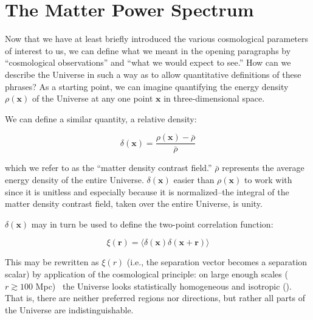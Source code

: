 \section{The Matter Power Spectrum}
\label{sec: Pk_intro}

Now that we have at least briefly introduced the various cosmological
parameters of interest to us, we can define what we meant in the opening
paragraphs by ``cosmological observations'' and ``what we would expect to
see.'' How can we describe the Universe in such a way as to allow quantitative 
definitions of these phrases? As a starting point, we can imagine quantifying 
the energy density $\rho(\bm{x})$ of the Universe at any one point $\bm{x}$ in 
three-dimensional space.


We can define a similar quantity, a relative density:

\begin{equation}
\delta(\bm{x}) = \frac{\rho(\bm{x}) - \bar{\rho}}{\bar{\rho}}
\end{equation}

which we refer to as the ``matter density contrast field.'' $\bar{\rho}$
represents the average energy density of the entire Universe. 
$\delta(\bm{x})$ easier than $\rho(\bm{x})$ to work with since it
is unitless and especially because it is normalized--the integral of the
matter density contrast field, taken over the entire Universe, is unity.

$\delta(\bm{x})$ may in turn be used to define the two-point correlation 
function:

\begin{equation}
\xi(\bm{r})
=
\langle \delta (\mathbf{x}) \delta(\mathbf{x} + \mathbf{r})\rangle
\end{equation}

This may be rewritten as $\xi(r)$ (i.e., the separation vector becomes a
separation scalar) by application of the cosmological principle: on large
enough scales ($r \gtrsim 100$ Mpc) \, the Universe looks statistically 
homogeneous and isotropic (). That is, there are neither 
preferred regions nor directions, but rather all parts of the Universe are
indistinguishable.

